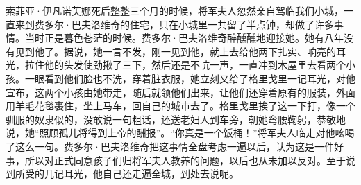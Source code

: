 \par 索菲亚·伊凡诺芙娜死后整整三个月的时候，将军夫人忽然亲自驾临我们小城，一直来到费多尔·巴夫洛维奇的住宅，只在小城里一共留了半点钟，却做了许多事情。当时正是暮色苍茫的时候。费多尔·巴夫洛维奇醉醺醺地迎接她。她有八年没有见到他了。据说，她一言不发，刚一见到他，就上去给他两下扎实、响亮的耳光，拉住他的头发使劲揪了三下，然后还是不吭一声，一直冲到木屋里去看两个小孩。一眼看到他们脸也不洗，穿着脏衣服，她立刻又给了格里戈里一记耳光，对他宣布，这两个小孩由她带走，随后就领他们出来，让他们还穿着原有的服装，外面用羊毛花毯裹住，坐上马车，回自己的城市去了。格里戈里挨了这一下打，像一个驯服的奴隶似的，没敢说一句粗话，还送老妇人到车旁，朝她弯腰鞠躬，恭敬地说，她“照顾孤儿将得到上帝的酬报”。“你真是一个饭桶！”将军夫人临走对他吆喝了这么一句。费多尔·巴夫洛维奇把这事情全盘考虑一遍以后，认为这是一件好事，所以对正式同意孩子们归将军夫人教养的问题，以后也从未加以反对。至于说到所受的几记耳光，他自己还走遍全城，到处去说呢。
